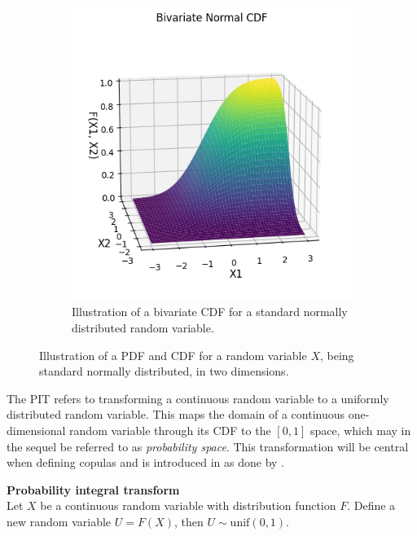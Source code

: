 \begin{figure}[h]
\begin{subfigure}[t]{0.45\linewidth}
        \centering
        \includegraphics[width=\linewidth]{3Theory/pictures/BivariateCDF.png}
        \caption{Illustration of a bivariate \gls{CDF} for a standard normally distributed random variable.}
        \label{fig:CDF2d}
    \end{subfigure}
    \caption{Illustration of a \gls{PDF} and \gls{CDF} for a random variable $X$, being standard normally distributed, in two dimensions.}
    \label{fig:JointCDFandPDF}
\end{figure}


The \gls{PIT} refers to transforming a continuous random variable to a uniformly distributed random variable. 
This maps the domain of a continuous one-dimensional random variable through its \gls{CDF} to the $[0,1]$ space, which may in the sequel be referred to as \emph{probability space}. This transformation will be central when defining copulas and is introduced in  as done by . 

\begin{theorem}\label{the:PIT} \textbf{Probability integral transform} \\
    Let $X$ be a continuous random variable with distribution function $F$. Define a new random variable $U = F(X)$, then $U \sim \mathrm{unif}(0,1)$. 
\end{theorem}

